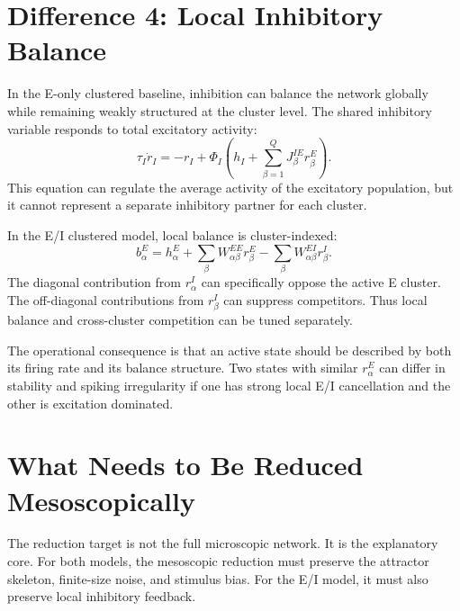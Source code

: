 \section{Difference 4: Local Inhibitory Balance}
\label{sec:difference-local-inhibitory-balance}

In the E-only clustered baseline, inhibition can balance the network globally while remaining weakly structured at the cluster level. The shared inhibitory variable responds to total excitatory activity:
%
\begin{equation}
  \tau_I\dot r_I
  =
  -r_I
  +
  \Phi_I\!\left(h_I+\sum_{\beta=1}^{Q}J^{IE}_{\beta}r_{\beta}^{E}\right).
  \label{eq:shared-inhibition-ch14}
\end{equation}
%
This equation can regulate the average activity of the excitatory population, but it cannot represent a separate inhibitory partner for each cluster.

In the E/I clustered model, local balance is cluster-indexed:
%
\begin{equation}
  b_{\alpha}^{E}
  =
  h_{\alpha}^{E}
  +
  \sum_{\beta}W_{\alpha\beta}^{EE}r_{\beta}^{E}
  -
  \sum_{\beta}W_{\alpha\beta}^{EI}r_{\beta}^{I}.
  \label{eq:cluster-indexed-balance-ch14}
\end{equation}
%
The diagonal contribution from $r_{\alpha}^{I}$ can specifically oppose the active E cluster. The off-diagonal contributions from $r_{\beta}^{I}$ can suppress competitors. Thus local balance and cross-cluster competition can be tuned separately.

The operational consequence is that an active state should be described by both its firing rate and its balance structure. Two states with similar $r_{\alpha}^{E}$ can differ in stability and spiking irregularity if one has strong local E/I cancellation and the other is excitation dominated.

\section{What Needs to Be Reduced Mesoscopically}
\label{sec:what-needs-reduced-mesoscopically}

The reduction target is not the full microscopic network. It is the explanatory core. For both models, the mesoscopic reduction must preserve the attractor skeleton, finite-size noise, and stimulus bias. For the E/I model, it must also preserve local inhibitory feedback.

